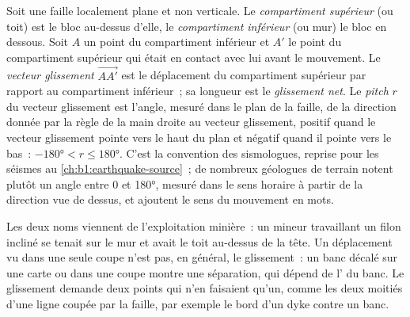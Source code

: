 \begin{definition}\label{def:b1:faults-folds-fabrics:fault-elements}
Soit une faille localement plane et non verticale. Le \emph{compartiment
supérieur} (ou toit) est le bloc au-dessus d'elle, le
\emph{compartiment inférieur} (ou mur) le bloc en dessous. Soit $A$ un point du
compartiment inférieur et $A'$ le point du compartiment supérieur qui était en contact avec lui
avant le mouvement. Le \emph{vecteur glissement}
$\overrightarrow{AA'}$ est le déplacement du compartiment supérieur par rapport au
compartiment inférieur~; sa longueur est le \emph{glissement net}. Le
\emph{pitch} $r$ du vecteur glissement est
l'angle, mesuré dans le plan de la faille, de la direction donnée par
la règle de la main droite au vecteur glissement, positif quand le vecteur glissement pointe vers le haut
du plan et négatif quand il pointe vers le bas~: $\ang{-180} < r \le \ang{180}$. C'est la
convention des sismologues, reprise pour les séismes au \cref{ch:b1:earthquake-source}~; de nombreux
géologues de terrain notent plutôt un angle entre 0 et \ang{180}, mesuré
dans le sens horaire à partir de la direction vue de dessus, et ajoutent le sens du mouvement en mots.
\end{definition}

Les deux noms viennent de l'exploitation minière~: un mineur travaillant un filon incliné se tenait sur le
mur et avait le toit au-dessus de la tête. Un déplacement vu dans une seule
coupe n'est pas, en général, le glissement~: un banc décalé sur une carte ou dans une
coupe montre une séparation, qui dépend de l' du banc. Le glissement
demande deux points qui n'en faisaient qu'un, comme les deux moitiés d'une ligne coupée par
la faille, par exemple le bord d'un dyke contre un banc.

